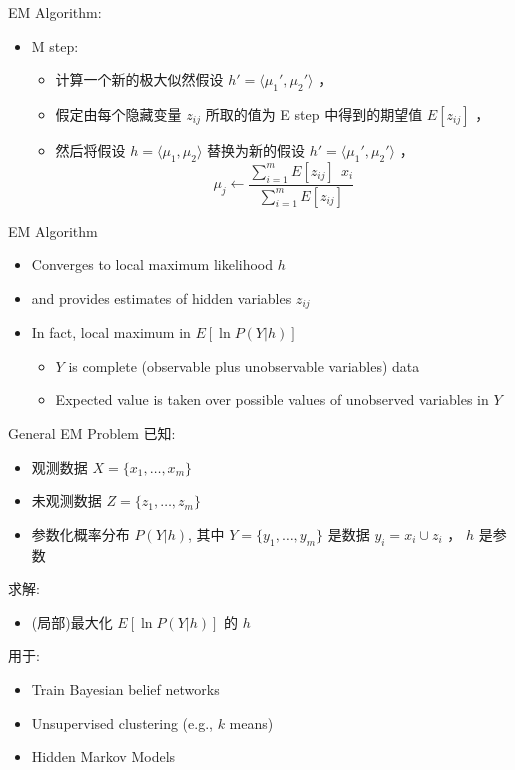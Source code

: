 \documentclass[presentation]{beamer}
\begin{document}
\begin{frame}[label={sec:org83e3a1f}]{EM Algorithm:}
\begin{itemize}
\item M step:
\begin{itemize}
\item 计算一个新的极大似然假设 \(h' = \langle \mu_1', \mu_2' \rangle\) ，
\item 假定由每个隐藏变量 \(z_{ij}\) 所取的值为 E step 中得到的期望值 \(E[z_{ij}]\) ，
\item 然后将假设 \(h =\langle \mu_1, \mu_2 \rangle\) 替换为新的假设 \(h' = \langle \mu_1', \mu_2' \rangle\) ，
$$\mu_j \leftarrow \frac{\sum_{i=1}^m E[z_{ij}] \ \  x_i}{\sum_{i=1}^m E[z_{ij}]}$$
\end{itemize}
\end{itemize}
\end{frame}

\begin{frame}[label={sec:org7e1f19e}]{EM Algorithm}
\begin{itemize}
\item Converges to local maximum likelihood \(h\)
\item and provides estimates of hidden variables \(z_{ij}\)
\item In fact, local maximum in \(E[\ln P(Y|h)]\)
\begin{itemize}
\item \(Y\) is complete (observable plus unobservable variables) data
\item Expected value is taken over possible values of unobserved variables in \(Y\)
\end{itemize}
\end{itemize}
\end{frame}


\begin{frame}[label={sec:org00e5e0a}]{General  EM Problem}
已知:
\begin{itemize}
\item 观测数据 \(X=\{x_1, \ldots, x_m\}\)
\item 未观测数据 \(Z=\{z_1, \dots, z_m\}\)
\item 参数化概率分布 \(P(Y|h)\), 其中  \(Y=\{y_1, \dots, y_m\}\) 是数据 \(y_i = x_i \cup z_i\) ，  \(h\) 是参数
\end{itemize}

求解:
\begin{itemize}
\item (局部)最大化 \(E[\ln P(Y|h)]\) 的 \(h\)
\end{itemize}


用于:
\begin{itemize}
\item Train Bayesian belief networks
\item Unsupervised clustering (e.g., \(k\) means)
\item Hidden Markov Models
\end{itemize}
\end{frame}
\end{document}
